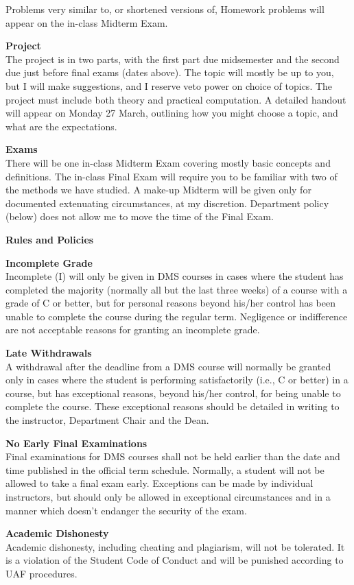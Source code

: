\documentclass[12pt]{article}
\renewcommand{\emph}[1]{\textsf{\textbf{#1}}}
\newcommand{\localhead}[1]{\par\smallskip\textbf{#1} \smallskip\nobreak\\}%
\def\heading#1{\localhead{\large\emph{#1}}}
\def\subheading#1{\localhead{\emph{#1}}}
\begin{document}
Problems very similar to, or shortened versions of, Homework problems will appear on the in-class Midterm Exam.


\heading{Project}
The project is in two parts, with the first part due midsemester and the second due just before final exams (dates above).  The topic will mostly be up to you, but I will make suggestions, and I reserve veto power on choice of topics.  The project must include both theory and practical computation.  A detailed handout will appear on Monday 27 March, outlining how you might choose a topic, and what are the expectations.


\heading{Exams}
There will be one in-class Midterm Exam covering mostly basic concepts and definitions. The in-class Final Exam will require you to be familiar with two of the methods we have studied.  A make-up Midterm will be given only for documented extenuating circumstances, at my discretion.  Department policy (below) does not allow me to move the time of the Final Exam.


\heading{Rules and Policies}
\vskip -20pt

\subheading{Incomplete Grade} 
Incomplete (I) will only be given in
  DMS courses in cases where
  the student has completed the majority (normally all but the last
  three weeks) of a course with a grade of C or better, but for
  personal reasons beyond his/her control has been unable to complete
  the course during the regular term. Negligence or indifference are
  not acceptable reasons for granting an incomplete grade.

\subheading{Late Withdrawals} 
A withdrawal after the deadline from a DMS course will
  normally be granted only in cases where the student is performing
  satisfactorily (i.e., C or better) in a course, but has exceptional
  reasons, beyond his/her control, for being unable to complete the
  course.  These exceptional reasons should be detailed in writing to
  the instructor, Department Chair and the Dean.

\subheading{No Early Final Examinations}
Final examinations for DMS courses shall not be held earlier than the date and time published in the official term schedule.  Normally, a student will not be allowed to take a final exam early.  Exceptions can be made by individual instructors, but should only be allowed in exceptional circumstances and in a manner which doesn't endanger the security of the exam.

\subheading{Academic Dishonesty}
Academic dishonesty, including cheating and plagiarism, will not be tolerated.  It is a violation of the Student Code of Conduct and will be punished according to UAF procedures.
\end{document}
